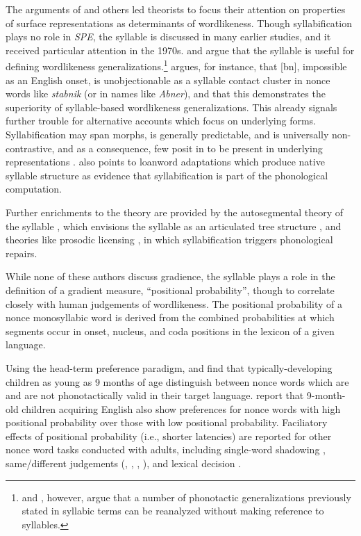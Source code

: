 The arguments of \citeauthor{Shibatani1973} and others led theorists to focus their attention on properties of surface representations as determinants of wordlikeness. Though syllabification plays no role in \emph{SPE}, the syllable is discussed in many earlier studies, and it received particular attention in the 1970s. \citet{Hooper1973} and \citet{Kahn1976} argue that the syllable is useful for defining wordlikeness generalizations.\footnote{\citet{Steriade1999} and \citet{Blevins2003}, however, argue that a number of phonotactic generalizations previously stated in syllabic terms can be reanalyzed without making reference to syllables.} \citeauthor{Hooper1973} argues, for instance, that [bn], impossible as an English onset, is unobjectionable as a syllable contact cluster in nonce words like \emph{stabnik} (or in names like \emph{Abner}), and that this demonstrates the superiority of syllable-based wordlikeness generalizations. This already signals further trouble for alternative accounts which focus on underlying forms. Syllabification may span morphs, is generally predictable, and is universally non-contrastive, and as a consequence, few posit in to be present in underlying representations \citep[though see, e.g.,][]{Vaux2003}. \citeauthor{Hooper1973} also points to loanword adaptations which produce native syllable structure \citep[e.g.,][]{Carlisle1991} as evidence that syllabification is part of the phonological computation.

Further enrichments to the theory are provided by the autosegmental theory of the syllable \citep{McCarthy1979b}, which envisions the syllable as an articulated tree structure \citep[as envisioned by][]{Pike1947a}, and theories like prosodic licensing \citep{Ito1989a}, in which syllabification triggers phonological repairs.

While none of these authors discuss gradience, the syllable plays a role in the definition of a gradient measure, ``positional probability'', though to correlate closely with human judgements of wordlikeness. The positional probability of a nonce monosyllabic word is derived from the combined probabilities at which segments occur in onset, nucleus, and coda positions in the lexicon of a given language. 

Using the head-term preference paradigm, \citet{Jusczyk1993b} and \citet{Friederici1993} find that typically-developing children as young as 9 months of age distinguish between nonce words which are and are not phonotactically valid in their target language. \citet{Jusczyk1994} report that 9-month-old children acquiring English also show preferences for nonce words with high positional probability over those with low positional probability. Faciliatory effects of positional probability (i.e., shorter latencies) are reported for other nonce word tasks conducted with adults, including single-word shadowing \citep{Vitevitch1997,Vitevitch1998}, same/different judgements (\citealt{Vitevitch1999a}, \citealt{Luce2001}, \citealt{Lipinski2005}, \citealt{Vitevitch2005}), and lexical decision \citep{Pylkkanen2002a}.

